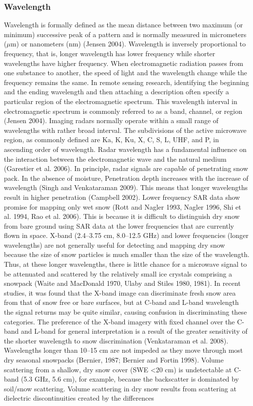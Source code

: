 \subsubsection{Wavelength}
Wavelength is formally defined as the mean distance between two maximum (or minimum) successive peak of a pattern and is normally measured in micrometers ($\mu$m) or nanometers (nm) (Jensen 2004). Wavelength is inversely proportional to frequency, that is, longer wavelength has lower frequency while shorter wavelengths have higher frequency. When electromagnetic radiation passes from one substance to another, the speed of light and the wavelength change while the frequency remains the same. In remote sensing research, identifying the beginning and the ending wavelength and then attaching a description often specify a particular region of the electromagnetic spectrum. This wavelength interval in electromagnetic spectrum is commonly referred to as a band, channel, or region (Jensen 2004). Imaging radars normally operate within a small range of wavelengths with rather broad interval. The subdivisions of the active microwave region, as commonly defined are Ka, K, Ku, X, C, S, L, UHF, and P, in ascending order of wavelength. Radar wavelength has a fundamental influence on the interaction between the electromagnetic wave and the natural medium (Garestier et al. 2006). In principle, radar signals are capable of penetrating snow pack. In the absence of moisture, Penetration depth increases with the increase of wavelength (Singh and Venkataraman 2009). This means that longer wavelengths result in higher penetration (Campbell 2002). Lower frequency SAR data show promise for mapping only wet snow (Rott and Nagler 1993, Nagler 1996, Shi et al. 1994, Rao et al. 2006). This is because it is difficult to distinguish dry snow from bare ground using SAR data at the lower frequencies that are currently flown in space. X-band (2.4–3.75 cm, 8.0–12.5 GHz) and lower frequencies (longer wavelengths) are not generally useful for detecting and mapping dry snow because the size of snow particles is much smaller than the size of the wavelength. Thus, at these longer wavelengths, there is little chance for a microwave signal to be attenuated and scattered by the relatively small ice crystals comprising a snowpack (Waite and MacDonald 1970, Ulaby and Stiles 1980, 1981). In recent studies, it was found that the X-band image can discriminate fresh snow area from that of snow free or bare surfaces, but at C-band and L-band wavelength the signal returns may be quite similar, causing confusion in discriminating these categories. The preference of the X-band imagery with fixed channel over the C- band and L-band for general interpretation is a result of the greater sensitivity of the shorter wavelength to snow discrimination (Venkataraman et al. 2008). Wavelengths longer than 10–15 cm are not impeded as they move through most dry seasonal snowpacks (Bernier, 1987; Bernier and Fortin 1998). Volume scattering from a shallow, dry snow cover (SWE <20 cm) is undetectable at C-band (5.3 GHz, 5.6 cm), for example, because the backscatter is dominated by soil/snow scattering. Volume scattering in dry snow results from scattering at dielectric discontinuities created by the differences 